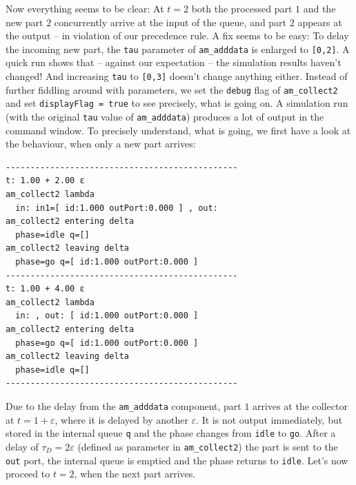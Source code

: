 \documentclass[12pt,oneside,a4paper,bibtotoc,BCOR=0pt,DIV=20]{scrreprt}
\newcommand{\cft}[1]{\mbox{\texttt{#1}}}   %
\newcommand{\epsi}{\varepsilon}
\begin{document}
Now everything seems to be clear: At $t = 2$ both the processed part $1$ and
the new part $2$ concurrently arrive at the input of the queue, and part $2$
appears at the output -- in violation of our precedence rule. A fix seems to be
easy: To delay the incoming new part, the \cft{tau} parameter of
\cft{am\_adddata} is enlarged to \cft{[0,2]}. A quick run shows that -- against
our expectation -- the simulation results haven't changed! And increasing
\cft{tau} to \cft{[0,3]} doesn't change anything either. Instead of further
fiddling around with parameters, we set the \cft{debug} flag of
\cft{am\_collect2} and set \cft{displayFlag = true} to see precisely, what is
going on. A simulation run (with the original \cft{tau} value of
\cft{am\_adddata}) produces a lot of output in the command window. To precisely
understand, what is going, we first have a look at the behaviour, when only a
new part arrives: 
\newpage
\begin{verbatim}
-----------------------------------------------
t: 1.00 + 2.00 ε
am_collect2 lambda
  in: in1=[ id:1.000 outPort:0.000 ] , out: 
am_collect2 entering delta
  phase=idle q=[] 
am_collect2 leaving delta
  phase=go q=[ id:1.000 outPort:0.000 ]
-----------------------------------------------
t: 1.00 + 4.00 ε
am_collect2 lambda
  in: , out: [ id:1.000 outPort:0.000 ]
am_collect2 entering delta
  phase=go q=[ id:1.000 outPort:0.000 ]
am_collect2 leaving delta
  phase=idle q=[] 
-----------------------------------------------
\end{verbatim}

Due to the delay from the \cft{am\_adddata} component, part $1$ arrives at the
collector at $t = 1 + \epsi$, where it is delayed by another $\epsi$. It is not
output immediately, but stored in the internal queue \cft{q} and the phase
changes from \cft{idle} to \cft{go}. After a delay of $\tau_D = 2\epsi$
(defined as parameter in \cft{am\_collect2}) the part is sent to the \cft{out}
port, the internal queue is emptied and the phase returns to \cft{idle}. Let's
now proceed to $t = 2$, when the next part arrives.
\end{document}
